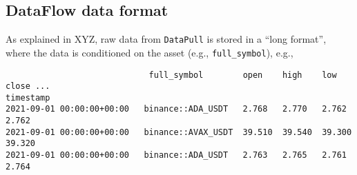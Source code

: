 \documentclass[11pt, reqno]{amsart}
\theoremstyle{definition}
\theoremstyle{remark}
\begin{document}
%
%
%
%

\subsection{DataFlow data format}

As explained in XYZ, raw data from \verb|DataPull| is stored in a
``long format'', where the data is conditioned on the asset (e.g.,
\verb|full_symbol|), e.g.,

\begin{verbatim}
                             full_symbol        open    high    low     close ...
timestamp
2021-09-01 00:00:00+00:00   binance::ADA_USDT   2.768   2.770   2.762   2.762
2021-09-01 00:00:00+00:00   binance::AVAX_USDT  39.510  39.540  39.300 39.320
2021-09-01 00:00:00+00:00   binance::ADA_USDT   2.763   2.765   2.761   2.764
\end{verbatim}
\end{document}
